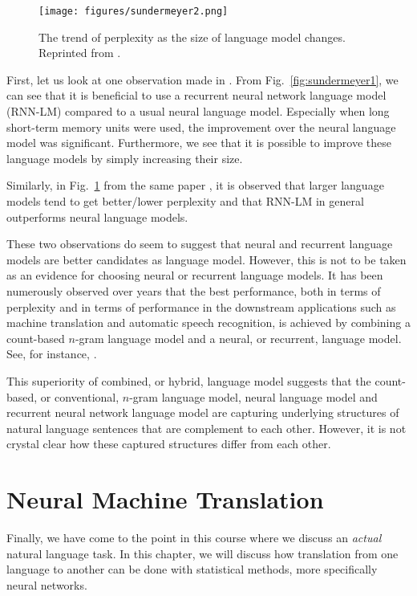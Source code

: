 \documentclass{report}
\begin{document}
\begin{figure}[ht]
    \centering
    \texttt{[image: figures/sundermeyer2.png]}

    \caption{
        The trend of perplexity as the size of language model changes.
        Reprinted from \citet{sundermeyer2015feedforward}.
    }
    \label{fig:sundermeyer2}
\end{figure}

First, let us look at one observation made in \citet{sundermeyer2015feedforward}.
From Fig.~\ref{fig:sundermeyer1}, we can see that it is beneficial to use a
recurrent neural network language model (RNN-LM) compared to a usual neural
language model. Especially when long short-term memory units were used, the
improvement over the neural language model was significant. Furthermore, we see
that it is possible to improve these language models by simply increasing their
size. 

Similarly, in Fig.~\ref{fig:sundermeyer2} from the same paper
\citep{sundermeyer2015feedforward}, it is observed that larger language models
tend to get better/lower perplexity and that RNN-LM in general outperforms
neural language models. 

These two observations do seem to suggest that neural and recurrent language
models are better candidates as language model. However, this is not to be taken
as an evidence for choosing neural or recurrent language models. It has been
numerously observed over years that the best performance, both in terms of
perplexity and in terms of performance in the downstream applications such as
machine translation and automatic speech recognition, is achieved by combining
a count-based $n$-gram language model and a neural, or recurrent, language
model. See, for instance, \citet{schwenk2007continuous}.

This superiority of combined, or hybrid, language model suggests that the
count-based, or conventional, $n$-gram language model, neural language model and
recurrent neural network language model are capturing underlying structures of
natural language sentences that are complement to each other. However, it is not
crystal clear how these captured structures differ from each other.

\chapter{Neural Machine Translation}
\label{chap:nmt}

Finally, we have come to the point in this course where we discuss an {\em
actual} natural language task. In this chapter, we will discuss how translation
from one language to another can be done with statistical methods, more
specifically neural networks.
\end{document}
